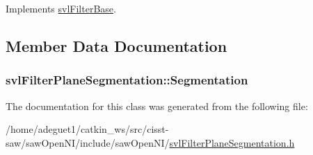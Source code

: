 Implements \hyperlink{classsvl_filter_base_aaff77d711088384d00e717fb4ec88aab}{svl\-Filter\-Base}.



\subsection{Member Data Documentation}
\hypertarget{classsvl_filter_plane_segmentation_a20b68f97c3fe7cf49b3fa38d402fdb7d}{
\subsubsection[{Segmentation}]{ svl\-Filter\-Plane\-Segmentation\-::\-Segmentation}}\label{classsvl_filter_plane_segmentation_a20b68f97c3fe7cf49b3fa38d402fdb7d}


The documentation for this class was generated from the following file\-:\begin{DoxyCompactItemize}
\item 
/home/adeguet1/catkin\-\_\-ws/src/cisst-\/saw/saw\-Open\-N\-I/include/saw\-Open\-N\-I/\hyperlink{svl_filter_plane_segmentation_8h}{svl\-Filter\-Plane\-Segmentation.\-h}\end{DoxyCompactItemize}
